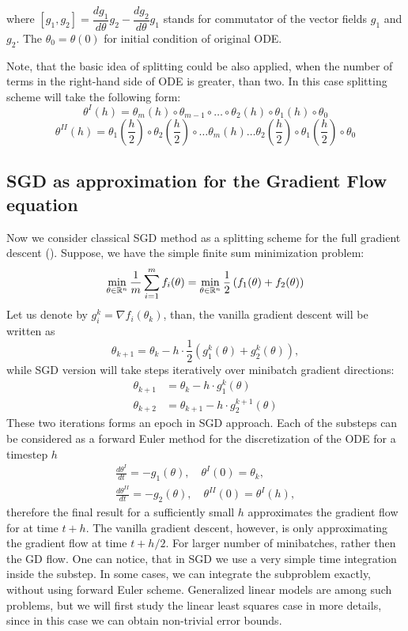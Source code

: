 \documentclass{article} %
\begin{document}
where $\left[ g_1, g_2\right] = \dfrac{d g_1}{d \theta} g_2 - \dfrac{d g_2}{d \theta} g_1 $ stands for commutator of the vector fields $g_1$ and $g_2$. The $\theta_0 = \theta(0)$ for initial condition of original ODE.

Note, that the basic idea of splitting could be also applied, when the number of terms in the right-hand side of ODE is greater, than two. In this case splitting scheme will take the following form:
\begin{equation}\label{strang:marchuk}
\theta^I(h) = \theta_m(h) \circ \theta_{m-1} \circ \ldots \circ \theta_2(h) \circ \theta_1(h) \circ \theta_0
\end{equation}
\begin{equation}\label{strang:strang}
\theta^{II}(h) = \theta_1\left(\frac{h}{2}\right) \circ \theta_2\left(\frac{h}{2}\right) \circ\ldots \theta_m(h) \ldots \theta_2\left(\frac{h}{2}\right) \circ \theta_1\left(\frac{h}{2}\right) \circ \theta_0
\end{equation}

\subsection{SGD as approximation for the Gradient Flow equation}
Now we consider classical SGD method as a splitting scheme for the full gradient descent (\cite{cauchy1847methode}). Suppose, we have the simple finite sum minimization problem:
$$
\min_{\theta \in {\mathbb{R}}^n} \dfrac{1}{m}\sum\limits_{i=1}^m f_i(\theta) = \min_{\theta \in {\mathbb{R}}^n} \frac{1}{2} \left( f_1(\theta) + f_2(\theta)\right)
$$
Let us denote by $g_i^k = \nabla f_i(\theta_k)$, than, the vanilla gradient descent will be written as
$$
\theta_{k+1} = \theta_k - h\cdot\frac{1}{2} \left( g^k_1(\theta) + g^k_2(\theta)\right),
$$
while SGD version will take steps iteratively over minibatch gradient directions:
\begin{align*}\label{strang:sgd2}
\theta_{k+1} &= \theta_k - h\cdot g^k_1(\theta) \\
\theta_{k+2} &= \theta_{k+1} - h\cdot  g^{k+1}_2(\theta)
\end{align*}
These two iterations forms an epoch in SGD approach. Each of the substeps can be considered as a forward Euler method for the discretization of the ODE for a timestep $h$
\begin{align*}
    \frac{d \theta^I}{d t} = -g_1(\theta), \quad \theta^I(0) = \theta_{k},\\
    \frac{d \theta^{II}}{d t} = -g_2(\theta), \quad \theta^{II}(0) = \theta^{I}(h),
\end{align*}
therefore the final result for a sufficiently small $h$ approximates the gradient flow for at time $t + h$. The vanilla gradient descent, however, is only approximating the gradient flow at time $t + h/2$. For larger number of minibatches, rather then the GD flow. One can notice, that in SGD we use a very simple time integration inside the substep. In some cases, we can integrate the subproblem exactly, without using forward Euler scheme. Generalized linear models are among such problems, but we will first study the linear least squares case in more details, since in this case we can obtain non-trivial error bounds.
\end{document}
